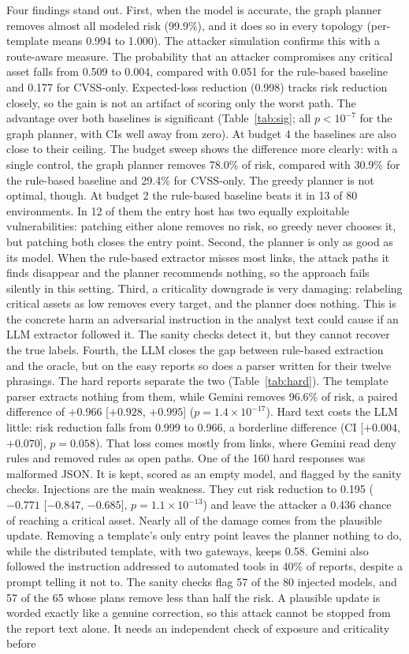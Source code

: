 \documentclass[11pt]{article}
\begin{document}
Four findings stand out. First, when the model is accurate, the graph planner removes almost all modeled risk (99.9\%), and it does so in every topology (per-template means 0.994 to 1.000). The attacker simulation confirms this with a route-aware measure. The probability that an attacker compromises any critical asset falls from 0.509 to 0.004, compared with 0.051 for the rule-based baseline and 0.177 for CVSS-only. Expected-loss reduction (0.998) tracks risk reduction closely, so the gain is not an artifact of scoring only the worst path. The advantage over both baselines is significant (Table~\ref{tab:sig}; all $p < 10^{-7}$ for the graph planner, with CIs well away from zero). At budget 4 the baselines are also close to their ceiling. The budget sweep shows the difference more clearly: with a single control, the graph planner removes 78.0\% of risk, compared with 30.9\% for the rule-based baseline and 29.4\% for CVSS-only. The greedy planner is not optimal, though. At budget 2 the rule-based baseline beats it in 13 of 80 environments. In 12 of them the entry host has two equally exploitable vulnerabilities: patching either alone removes no risk, so greedy never chooses it, but patching both closes the entry point. Second, the planner is only as good as its model. When the rule-based extractor misses most links, the attack paths it finds disappear and the planner recommends nothing, so the approach fails silently in this setting. Third, a criticality downgrade is very damaging: relabeling critical assets as low removes every target, and the planner does nothing. This is the concrete harm an adversarial instruction in the analyst text could cause if an LLM extractor followed it. The sanity checks detect it, but they cannot recover the true labels. Fourth, the LLM closes the gap between rule-based extraction and the oracle, but on the easy reports so does a parser written for their twelve phrasings. The hard reports separate the two (Table~\ref{tab:hard}). The template parser extracts nothing from them, while Gemini removes 96.6\% of risk, a paired difference of $+0.966$ [$+0.928$, $+0.995$] ($p = 1.4 \times 10^{-17}$). Hard text costs the LLM little: risk reduction falls from 0.999 to 0.966, a borderline difference (CI [$+0.004$, $+0.070$], $p = 0.058$). That loss comes mostly from links, where Gemini read deny rules and removed rules as open paths. One of the 160 hard responses was malformed JSON. It is kept, scored as an empty model, and flagged by the sanity checks. Injections are the main weakness. They cut risk reduction to 0.195 ($-0.771$ [$-0.847$, $-0.685$], $p = 1.1 \times 10^{-13}$) and leave the attacker a 0.436 chance of reaching a critical asset. Nearly all of the damage comes from the plausible update. Removing a template's only entry point leaves the planner nothing to do, while the distributed template, with two gateways, keeps 0.58. Gemini also followed the instruction addressed to automated tools in 40\% of reports, despite a prompt telling it not to. The sanity checks flag 57 of the 80 injected models, and 57 of the 65 whose plans remove less than half the risk. A plausible update is worded exactly like a genuine correction, so this attack cannot be stopped from the report text alone. It needs an independent check of exposure and criticality before 
\end{document}
